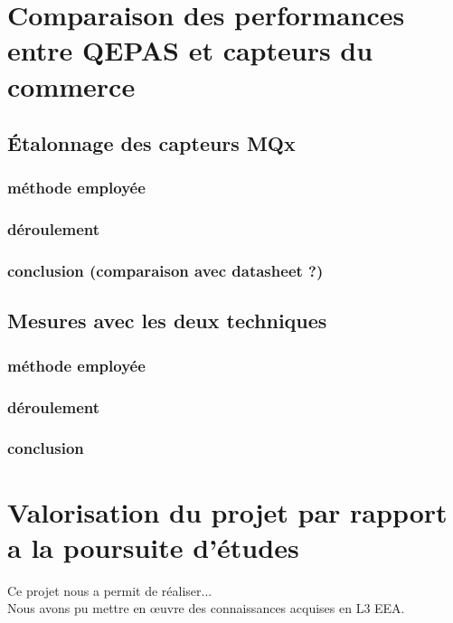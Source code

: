 \documentclass[a4paper]{report}
\begin{document}
	\chapter{Comparaison des performances entre QEPAS et capteurs du commerce}
	\section{Étalonnage des capteurs MQx}
	\subsection{méthode employée}
	\subsection{déroulement}
	\subsection{conclusion (comparaison avec datasheet ?)}
	
	\section{Mesures avec les deux techniques}
	\subsection{méthode employée}
	\subsection{déroulement}
	\subsection{conclusion}
	

	\chapter{Valorisation du projet par rapport a la poursuite d'études}
	
		Ce projet nous a permit de réaliser... \\
		Nous avons pu mettre en œuvre des connaissances acquises en L3 EEA.\\
	
 
\end{document}
